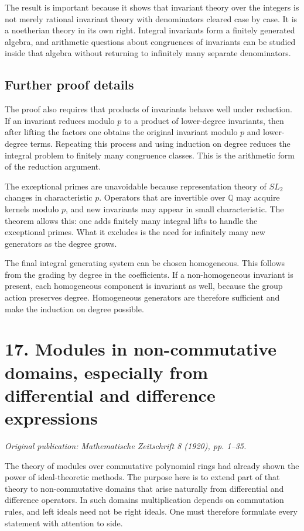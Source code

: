 \documentclass[12pt]{article}
\begin{document}
The result is important because it shows that invariant theory over the integers is not merely
rational invariant theory with denominators cleared case by case. It is a noetherian theory in its
own right. Integral invariants form a finitely generated algebra, and arithmetic questions about
congruences of invariants can be studied inside that algebra without returning to infinitely many
separate denominators.


\subsection{Further proof details}

The proof also requires that products of invariants behave well under reduction. If an invariant
reduces modulo \(p\) to a product of lower-degree invariants, then after lifting the factors one
obtains the original invariant modulo \(p\) and lower-degree terms. Repeating this process and using
induction on degree reduces the integral problem to finitely many congruence classes. This is the
arithmetic form of the reduction argument.

The exceptional primes are unavoidable because representation theory of \(SL_2\) changes in
characteristic \(p\). Operators that are invertible over \(\mathbb Q\) may acquire kernels modulo
\(p\), and new invariants may appear in small characteristic. The theorem allows this: one adds
finitely many integral lifts to handle the exceptional primes. What it excludes is the need for
infinitely many new generators as the degree grows.

The final integral generating system can be chosen homogeneous. This follows from the grading by
degree in the coefficients. If a non-homogeneous invariant is present, each homogeneous component is
invariant as well, because the group action preserves degree. Homogeneous generators are therefore
sufficient and make the induction on degree possible.


\section{17. Modules in non-commutative domains, especially from differential and difference expressions}

\textit{Original publication: Mathematische Zeitschrift 8 (1920), pp. 1--35.}

The theory of modules over commutative polynomial rings had already shown the power of
ideal-theoretic methods. The purpose here is to extend part of that theory to non-commutative
domains that arise naturally from differential and difference operators. In such domains
multiplication depends on commutation rules, and left ideals need not be right ideals. One must
therefore formulate every statement with attention to side.
\end{document}
